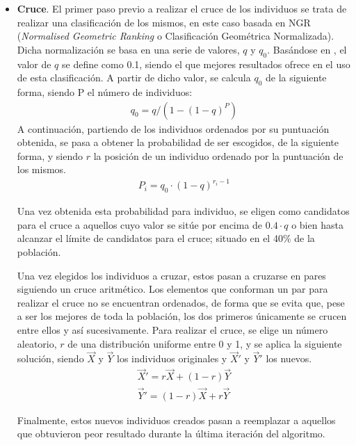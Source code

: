 \documentclass[11pt,spanish,listoffigures,listoftables]{tfgetsinf}
\begin{document}
\begin{itemize}
    \item \textbf{Cruce}. El primer paso previo a realizar el cruce de los individuos se trata de realizar una clasificación de los mismos, en este caso basada en NGR (\textit{Normalised Geometric Ranking} o Clasificación Geométrica Normalizada). Dicha normalización se basa en una serie de valores, $q$ y $q_0$. Basándose en \cite{GARZELLI2008223}, el valor de $q$ se define como 0.1, siendo el que mejores resultados ofrece en el uso de esta clasificación. A partir de dicho valor, se calcula $q_0$ de la siguiente forma, siendo P el número de individuos:
    \begin{align*}
        q_{0} = q / (1 - (1 - q)^{P})
    \end{align*}
    A continuación, partiendo de los individuos ordenados por su puntuación obtenida, se pasa a obtener la probabilidad de ser escogidos, de la siguiente forma, y siendo $r$ la posición de un individuo ordenado por la puntuación de los mismos.
    \begin{align*}
        P_{i} = q_{0} \cdot (1 - q)^{r_{i}-1} 
    \end{align*}
    
    Una vez obtenida esta probabilidad para individuo, se eligen como candidatos para el cruce a aquellos cuyo valor se sitúe por encima de $0.4 \cdot q$ o bien hasta alcanzar el límite de candidatos para el cruce; situado en el 40\% de la población.
    
    Una vez elegidos los individuos a cruzar, estos pasan a cruzarse en pares siguiendo un cruce aritmético. Los elementos que conforman un par para realizar el cruce no se encuentran ordenados, de forma que se evita que, pese a ser los mejores de toda la población, los dos primeros únicamente se crucen entre ellos y así sucesivamente. Para realizar el cruce, se elige un número aleatorio, $r$ de una distribución uniforme entre 0 y 1, y se aplica la siguiente solución, siendo $\Vec{X}$ y $\Vec{Y}$ los individuos originales y $\Vec{X}'$ y $\Vec{Y}'$ los nuevos.
    \begin{align*}
        \Vec{X}' = r\Vec{X} + (1-r)\Vec{Y} \\
        \Vec{Y}' = (1-r)\Vec{X} + r\Vec{Y}
    \end{align*}
    
    Finalmente, estos nuevos individuos creados pasan a reemplazar a aquellos que obtuvieron peor resultado durante la última iteración del algoritmo.
    

\end{itemize}
\end{document}
